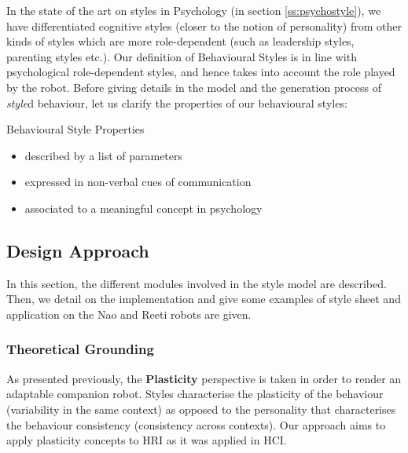 \documentclass[smallextended]{svjour3}
\begin{document}
In the state of the art on styles in Psychology (in section \ref{ss:psychostyle}), we have differentiated cognitive styles (closer to the notion of personality) from other kinds of styles which are more role-dependent (such as leadership styles, parenting styles etc.).
Our definition of Behavioural Styles is in line with psychological role-dependent styles, and hence takes into account the role played by the robot.
Before giving details in the model and the generation process of \textit{style}d behaviour, let us clarify the properties of our behavioural styles:
\begin{center}
Behavioural Style Properties
	\begin{itemize}[noitemsep]
		\item described by a list of parameters
		\item expressed in non-verbal cues of communication
		\item associated to a meaningful concept in psychology
	\end{itemize}
\end{center}




\subsection{Design Approach}
In this section, the different modules involved in the style model are described. 
Then, we detail on the implementation and give some examples of style sheet and application on the Nao  and Reeti robots are given.

\subsubsection{Theoretical Grounding}
As presented previously, the \textbf{Plasticity} perspective is taken in order to render an adaptable companion robot.
Styles characterise the plasticity of the behaviour (variability in the same context) as opposed to the personality that characterises the behaviour consistency (consistency across contexts).
Our approach aims to apply plasticity concepts to HRI as it was applied in HCI. 
\end{document}
